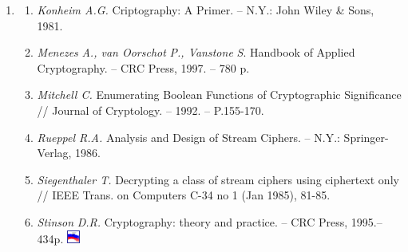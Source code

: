 \documentclass[a4paper]{article}
\newcounter{saveenum}
\newcommand\liststyleWWviiiNumli{%
\renewcommand\theenumi{\arabic{enumi}}
\renewcommand\theenumii{\arabic{enumii}}
\renewcommand\theenumiii{\Alph{enumiii}}
\renewcommand\theenumiv{\arabic{enumiv}}
\renewcommand\labelenumi{\theenumi)}
\renewcommand\labelenumii{\theenumii.}
\renewcommand\labelenumiii{\theenumiii.}
\renewcommand\labelenumiv{\theenumiv.}
}
\newcounter{}
\begin{document}
\bigskip


\bigskip

\liststyleWWviiiNumli
\setcounter{saveenum}{\value{enumi}}
\begin{enumerate}
\setcounter{enumi}{\value{saveenum}}
\item \begin{enumerate}
\item \textit{Konheim A.G.} Criptography: A Primer. – N.Y.: John Wiley \& Sons,
1981.
\item \textit{Menezes}\textit{ }\textit{A., van Oorschot}\textit{ }\textit{P.,
Vanstone}\textit{ }\textit{S}.  Handbook of  Applied Cryptography. – CRC Press,
1997. – 780 p.
\item \textit{Mitchell C.} Enumerating Boolean Functions of Cryptographic
Significance // Journal of Cryptology. – 1992. – P.155-170.
\item \textit{Rueppel R.A.} Analysis and Design of Stream Ciphers. – N.Y.:
Springer-Verlag, 1986.
\item \textit{S}\textit{iegenthaler T.} Decrypting a class of stream ciphers
using ciphertext only // IEEE Trans. on Computers C-34 no 1 (Jan 1985), 81-85.
\item \textit{Stinson}\textit{ }\textit{D.R.} Cryptography: theory and practice.
– CRC Press, 1995.– 434p.
\includegraphics[width=0.1665in,height=0.1665in]{crypt-img/crypt-img341.png} 
\end{enumerate}
\end{enumerate}
\end{document}
